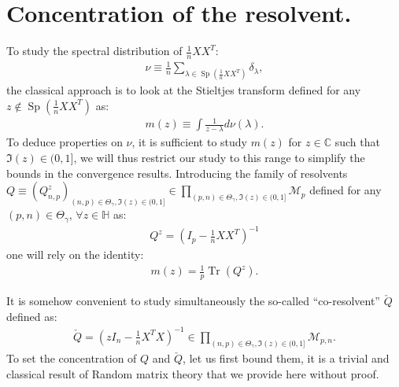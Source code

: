 \documentclass[ECP, preprint]{ejpecp} %
\DeclareMathOperator{\tr}{Tr}
\DeclareMathOperator{\spctr}{Sp}
\begin{document}
\section{Concentration of the resolvent.}
To study the spectral distribution of $\frac{1}{n}XX^T$:
\begin{align*}
    \nu \equiv \frac{1}{n}\sum_{\lambda \in \spctr(\frac{1}{n}XX^T)} \delta_{\lambda},
 \end{align*} 
 the classical approach is to look at the Stieltjes transform defined for any $z\notin \spctr(\frac{1}{n}XX^T)$ as:
 \begin{align*}
    m(z) \equiv \int \frac{1}{z- \lambda } d\nu(\lambda).
 \end{align*}
 To deduce properties on $\nu$, it is sufficient to study $m(z)$ for $z\in \mathbb C$ such that $\Im(z)\in (0,1]$, we will thus restrict our study to this range to simplify the bounds in the convergence results.
 Introducing the family of resolvents $Q\equiv (Q^z_{n,p})_{(n,p) \in \Theta_\gamma, \Im(z)\in(0,1]}\in \prod_{(p,n)\in \Theta_\gamma, \Im(z)\in(0,1]} \mathcal{M}_{p}$ defined for any $(p,n) \in \Theta_\gamma$, $\forall z\in \mathbb H$ as:
 \begin{align*}
     Q^z = \left(I_p - \frac{1}{n}XX^T\right)^{-1}
 \end{align*}
 one will rely on the identity:
 \begin{align*}
    m(z) = \frac{1}{p}\tr(Q^z).
 \end{align*}

 It is somehow convenient to study simultaneously the so-called ``co-resolvent'' $\check Q$ defined as:
 \begin{align*}
    \check Q = \left( zI_n - \frac{1}{n}X^TX\right)^{-1}\in \prod_{(n,p)\in \Theta_\gamma, \Im(z)\in (0,1]} \mathcal{M}_{p,n}.
 \end{align*}
 To set the concentration of $Q$ and $\check Q$, let us first bound them, it is a trivial and classical result of Random matrix theory that we provide here without proof.
\end{document}
